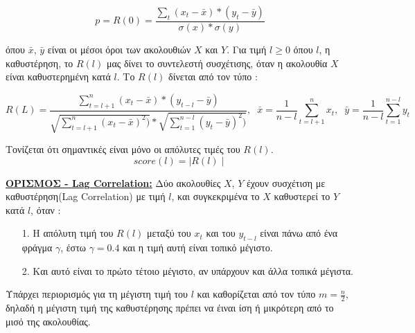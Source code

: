 \documentclass[a4paper,12pt]{article}
\begin{document}
 \begin{equation*}
  p = R(0) = \frac{\sum_{t}(x_t - \bar{x})*(y_t - \bar{y})}{\sigma(x)*\sigma(y)}
 \end{equation*}
 
\noindent όπου $\bar{x}$, $\bar{y}$ είναι οι μέσοι όροι των ακολουθιών $X$ και $Y$. Για τιμή $l\geq 0$ όπου $l$, η καθυστέρηση, το $R(l)$ μας δίνει το συντελεστή συσχέτισης, όταν η ακολουθία $X$ είναι καθυστερημένη κατά $l$. Το $R(l)$ δίνεται από τον τύπο :

 \begin{equation*}
  R(L) = \frac{\sum_{t=l+1}^{n}(x_t - \bar{x})*(y_{t-l} - \bar{y})}{\sqrt{\sum_{t=l+1}^{n}(x_t - \bar{x})^2)}*\sqrt{\sum_{t=1}^{n-l}(y_t - \bar{y})^2)}} ,\;\; \bar{x}=\frac{1}{n-l}\sum\limits_{t=l+1}^{n}x_t ,\;\; \bar{y}=\frac{1}{n-l}\sum\limits_{t=1}^{n-l}y_t
 \end{equation*}

\noindent Τονίζεται ότι σημαντικές είναι μόνο οι απόλυτες τιμές του $R(l)$.
 \begin{equation*}
  score(l) = \mid R(l) \mid
 \end{equation*}
 
 \noindent \textbf{\underline{ΟΡΙΣΜΟΣ - \textlatin{Lag Correlation}:}} Δύο ακολουθίες $X$, $Y$ έχουν συσχέτιση με καθυστέρηση(\textlatin{Lag Correlation}) με τιμή $l$, και συγκεκριμένα το $X$ καθυστερεί το $Y$ κατά $l$, όταν :
 
 \begin{enumerate}
 \item[1.] Η απόλυτη τιμή του $R(l)$ μεταξύ του $x_t$ και του $y_{t-l}$ είναι πάνω από ένα φράγμα $\gamma$, έστω $\gamma=0.4$ και η τιμή αυτή είναι τοπικό μέγιστο.
 \item[2.] Και αυτό είναι το πρώτο τέτοιο μέγιστο, αν υπάρχουν και άλλα τοπικά μέγιστα.
 \end{enumerate}
 
 \noindent Υπάρχει περιορισμός για τη μέγιστη τιμή του $l$ και καθορίζεται από τον τύπο $m=\frac{n}{2}$, δηλαδή η μέγιστη τιμή της καθυστέρησης πρέπει να έιναι ίση ή μικρότερη από το μισό της ακολουθίας.
\end{document}
